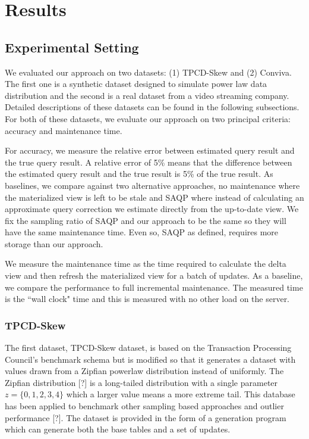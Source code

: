 \section{Results}
\label{exp}

\subsection{Experimental Setting}
We evaluated our approach on two datasets: (1) TPCD-Skew and (2) Conviva.
The first one is a synthetic dataset designed to simulate power law data distribution and the second is 
a real dataset from a video streaming company.
Detailed descriptions of these datasets can be found in the following subsections.
For both of these datasets, we evaluate our approach on two principal criteria: accuracy and maintenance time.

For accuracy, we measure the relative error between estimated query result and the true query result.
A relative error of 5\% means that the difference between the estimated query result and the true result is 5\% of the true result.
As baselines, we compare against two alternative approaches, no maintenance where the materialized view is left to be stale and SAQP where instead 
of calculating an approximate query correction we estimate directly from the up-to-date view.
We fix the sampling ratio of SAQP and our approach to be the same so they will have the same maintenance time.
Even so, SAQP as defined, requires more storage than our approach.

We measure the maintenance time as the time required to calculate the delta view and then refresh the materialized view for a batch of updates.
As a baseline, we compare the performance to full incremental maintenance.
The measured time is the ``wall clock" time and this is measured with no other load on the server.

\subsubsection{TPCD-Skew}
The first dataset, TPCD-Skew dataset, is based on the Transaction Processing Council's benchmark
schema but is modified so that it generates a dataset with values drawn from a Zipfian powerlaw distribution instead of uniformly.
The Zipfian distribution [?] is a long-tailed distribution with a single parameter $z=\{0,1,2,3,4\}$ which a larger
value means a more extreme tail.
This database has been applied to benchmark other sampling based approaches and outlier performance [?].
The dataset is provided in the form of a generation program which can generate both the base tables and a set of updates.

